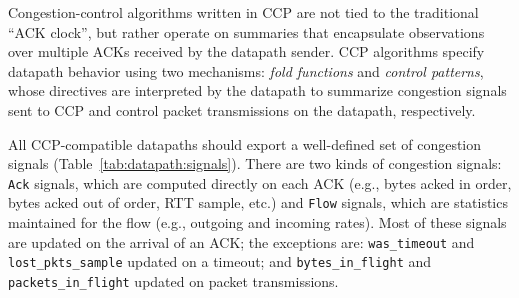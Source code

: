 
Congestion-control algorithms written in CCP are not tied to the traditional ``ACK clock'', but rather operate on summaries that encapsulate observations over multiple ACKs received by the datapath sender.
CCP algorithms specify datapath behavior using two mechanisms: {\em fold functions} and {\em control patterns}, whose directives are interpreted by the datapath to summarize congestion signals sent to CCP and control packet transmissions on the datapath, respectively. 

 All CCP-compatible datapaths should export a well-defined set of congestion signals (Table~\ref{tab:datapath:signals}). There are two kinds of congestion signals: \texttt{Ack} signals, which are computed directly on each ACK (e.g., bytes acked in order, bytes acked out of order, RTT sample, etc.) and \texttt{Flow} signals, which are statistics maintained for the flow (e.g., outgoing and incoming rates). Most of these signals are updated on the arrival of an ACK; the exceptions are: \texttt{was\_timeout} and \texttt{lost\_pkts\_sample} updated on a timeout; and \texttt{bytes\_in\_flight} and \texttt{packets\_in\_flight} updated on packet transmissions.



